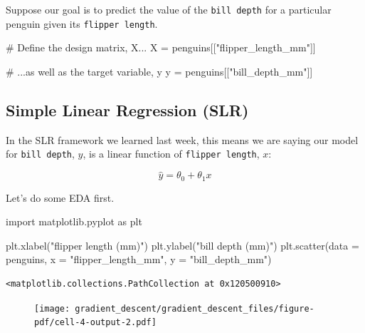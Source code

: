 \documentclass[
  letterpaper,
  DIV=11,
  numbers=noendperiod]{scrreprt}
\newenvironment{Shaded}{\begin{snugshade}}{\end{snugshade}}
\newcommand{\CommentTok}[1]{\textcolor[rgb]{0.37,0.37,0.37}{#1}}
\newcommand{\ImportTok}[1]{\textcolor[rgb]{0.00,0.46,0.62}{#1}}
\newcommand{\NormalTok}[1]{\textcolor[rgb]{0.00,0.23,0.31}{#1}}
\newcommand{\OperatorTok}[1]{\textcolor[rgb]{0.37,0.37,0.37}{#1}}
\newcommand{\StringTok}[1]{\textcolor[rgb]{0.13,0.47,0.30}{#1}}
\begin{document}
Suppose our goal is to predict the value of the
\texttt{\textquotesingle{}bill\ depth\textquotesingle{}} for a
particular penguin given its
\texttt{\textquotesingle{}flipper\ length\textquotesingle{}}.

\begin{Shaded}
\begin{Highlighting}[]
\CommentTok{\# Define the design matrix, X...}
\NormalTok{X }\OperatorTok{=}\NormalTok{ penguins[[}\StringTok{"flipper\_length\_mm"}\NormalTok{]]}

\CommentTok{\# ...as well as the target variable, y}
\NormalTok{y }\OperatorTok{=}\NormalTok{ penguins[[}\StringTok{"bill\_depth\_mm"}\NormalTok{]]}
\end{Highlighting}
\end{Shaded}

\hypertarget{simple-linear-regression-slr}{%
\subsection{Simple Linear Regression
(SLR)}\label{simple-linear-regression-slr}}

In the SLR framework we learned last week, this means we are saying our
model for \texttt{bill\ depth}, \(y\), is a linear function of
\texttt{flipper\ length}, \(x\):

\[\hat{y} = \theta_0 + \theta_1 x\]

Let's do some EDA first.

\begin{Shaded}
\begin{Highlighting}[]
\ImportTok{import}\NormalTok{ matplotlib.pyplot }\ImportTok{as}\NormalTok{ plt}

\NormalTok{plt.xlabel(}\StringTok{"flipper length (mm)"}\NormalTok{)}
\NormalTok{plt.ylabel(}\StringTok{"bill depth (mm)"}\NormalTok{)}
\NormalTok{plt.scatter(data }\OperatorTok{=}\NormalTok{ penguins, x }\OperatorTok{=} \StringTok{"flipper\_length\_mm"}\NormalTok{, y }\OperatorTok{=} \StringTok{"bill\_depth\_mm"}\NormalTok{)}
\end{Highlighting}
\end{Shaded}

\begin{verbatim}
<matplotlib.collections.PathCollection at 0x120500910>
\end{verbatim}

\begin{figure}[H]

{\centering \texttt{[image: gradient\_descent/gradient\_descent\_files/figure-pdf/cell-4-output-2.pdf]}

}

\end{figure}
\end{document}
